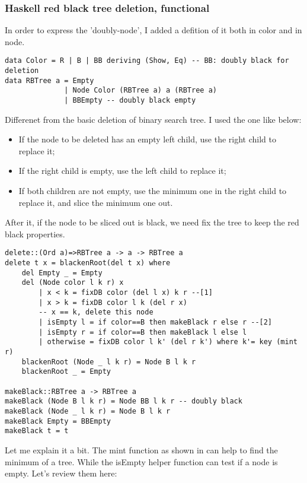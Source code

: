 \documentclass{article}
\begin{document}
\subsubsection*{Haskell red black tree deletion, functional}

In order to express the 'doubly-node', I added a defition of it both in color and in node.

\lstset{language=Haskell}
\begin{lstlisting}
data Color = R | B | BB deriving (Show, Eq) -- BB: doubly black for deletion
data RBTree a = Empty
              | Node Color (RBTree a) a (RBTree a)
              | BBEmpty -- doubly black empty
\end{lstlisting}

Differenet from the basic deletion of binary search tree. I used the one like below:
\begin{itemize}
\item If the node to be deleted has an empty left child, use the right child to replace it;
\item If the right child is empty, use the left child to replace it;
\item If both children are not empty, use the minimum one in the right child to replace it, and
slice the minimum one out.
\end{itemize}

After it, if the node to be sliced out is black, we need fix the tree to keep the red black
properties.

\begin{lstlisting}
delete::(Ord a)=>RBTree a -> a -> RBTree a
delete t x = blackenRoot(del t x) where
    del Empty _ = Empty
    del (Node color l k r) x 
        | x < k = fixDB color (del l x) k r --[1]
        | x > k = fixDB color l k (del r x)
        -- x == k, delete this node
        | isEmpty l = if color==B then makeBlack r else r --[2]
        | isEmpty r = if color==B then makeBlack l else l
        | otherwise = fixDB color l k' (del r k') where k'= key (mint r)
    blackenRoot (Node _ l k r) = Node B l k r
    blackenRoot _ = Empty

makeBlack::RBTree a -> RBTree a
makeBlack (Node B l k r) = Node BB l k r -- doubly black
makeBlack (Node _ l k r) = Node B l k r
makeBlack Empty = BBEmpty
makeBlack t = t
\end{lstlisting}

Let me explain it a bit. The mint function as shown in \cite{bst-lxy} can help to find the 
minimum of a tree. While the isEmpty helper function can test if a node is empty. Let's review 
them here:
\end{document}
